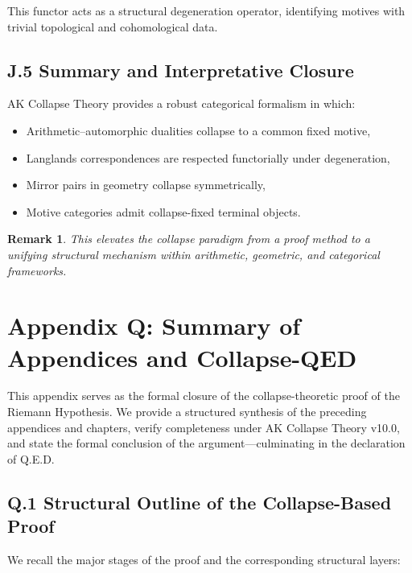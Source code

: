 \documentclass[11pt]{article}
\newtheorem{remark}[theorem]{Remark}
\begin{document}
This functor acts as a structural degeneration operator, identifying motives with trivial topological and cohomological data.

\subsection*{J.5 Summary and Interpretative Closure}

AK Collapse Theory provides a robust categorical formalism in which:

\begin{itemize}
    \item Arithmetic–automorphic dualities collapse to a common fixed motive,
    \item Langlands correspondences are respected functorially under degeneration,
    \item Mirror pairs in geometry collapse symmetrically,
    \item Motive categories admit collapse-fixed terminal objects.
\end{itemize}

\begin{remark}
This elevates the collapse paradigm from a proof method to a unifying structural mechanism  
within arithmetic, geometric, and categorical frameworks.
\end{remark}



\section*{Appendix Q: Summary of Appendices and Collapse-QED}

This appendix serves as the formal closure of the collapse-theoretic proof of the Riemann Hypothesis.  
We provide a structured synthesis of the preceding appendices and chapters, verify completeness under AK Collapse Theory v10.0,  
and state the formal conclusion of the argument—culminating in the declaration of Q.E.D.

\subsection*{Q.1 Structural Outline of the Collapse-Based Proof}

We recall the major stages of the proof and the corresponding structural layers:
\end{document}
